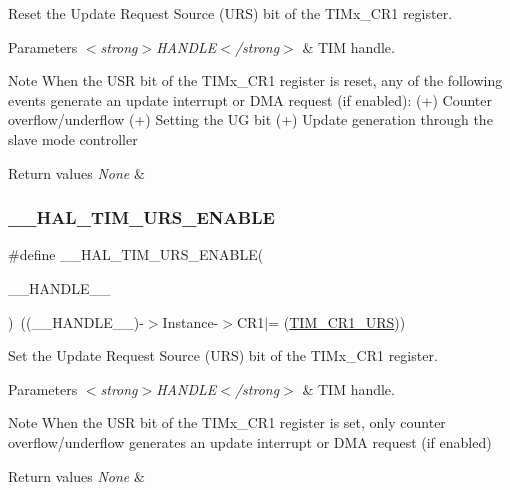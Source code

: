Reset the Update Request Source (U\+RS) bit of the T\+I\+Mx\+\_\+\+C\+R1 register. 


\begin{DoxyParams}{Parameters}
{\em $<$strong$>$\+H\+A\+N\+D\+L\+E$<$/strong$>$} & T\+IM handle. \\
\hline
\end{DoxyParams}
\begin{DoxyNote}{Note}
When the U\+SR bit of the T\+I\+Mx\+\_\+\+C\+R1 register is reset, any of the following events generate an update interrupt or D\+MA request (if enabled)\+: (+) Counter overflow/underflow (+) Setting the UG bit (+) Update generation through the slave mode controller 
\end{DoxyNote}

\begin{DoxyRetVals}{Return values}
{\em None} & \\
\hline
\end{DoxyRetVals}
\mbox{\label{group___t_i_m___exported___macros_ga3b06856bd6d7e10cfff342b1726db51d}} 
\subsubsection{\texorpdfstring{\+\_\+\+\_\+\+H\+A\+L\+\_\+\+T\+I\+M\+\_\+\+U\+R\+S\+\_\+\+E\+N\+A\+B\+LE}{\_\_HAL\_TIM\_URS\_ENABLE}}
{\footnotesize\ttfamily \#define \+\_\+\+\_\+\+H\+A\+L\+\_\+\+T\+I\+M\+\_\+\+U\+R\+S\+\_\+\+E\+N\+A\+B\+LE(\begin{DoxyParamCaption}\item[{}]{\+\_\+\+\_\+\+H\+A\+N\+D\+L\+E\+\_\+\+\_\+ }\end{DoxyParamCaption})~((\+\_\+\+\_\+\+H\+A\+N\+D\+L\+E\+\_\+\+\_\+)-\/$>$Instance-\/$>$C\+R1$\vert$= (\hyperlink{group___peripheral___registers___bits___definition_ga06c997c2c23e8bef7ca07579762c113b}{T\+I\+M\+\_\+\+C\+R1\+\_\+\+U\+RS}))}



Set the Update Request Source (U\+RS) bit of the T\+I\+Mx\+\_\+\+C\+R1 register. 


\begin{DoxyParams}{Parameters}
{\em $<$strong$>$\+H\+A\+N\+D\+L\+E$<$/strong$>$} & T\+IM handle. \\
\hline
\end{DoxyParams}
\begin{DoxyNote}{Note}
When the U\+SR bit of the T\+I\+Mx\+\_\+\+C\+R1 register is set, only counter overflow/underflow generates an update interrupt or D\+MA request (if enabled) 
\end{DoxyNote}

\begin{DoxyRetVals}{Return values}
{\em None} & \\
\hline
\end{DoxyRetVals}
